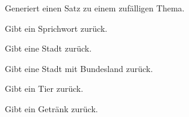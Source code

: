 \documentclass[a4paper,12pt,oneside]{sphinxmanual}
\begin{document}

\begin{fulllineitems}
\label{funktionen:pyzufall.satz_thema}
Generiert einen Satz zu einem zufälligen Thema.

\end{fulllineitems}


\begin{fulllineitems}
\label{funktionen:pyzufall.sprichwort}
Gibt ein Sprichwort zurück.

\end{fulllineitems}


\begin{fulllineitems}
\label{funktionen:pyzufall.stadt}
Gibt eine Stadt zurück.

\end{fulllineitems}


\begin{fulllineitems}
\label{funktionen:pyzufall.stadt_bl}
Gibt eine Stadt mit Bundesland zurück.

\end{fulllineitems}


\begin{fulllineitems}
\label{funktionen:pyzufall.tier}
Gibt ein Tier zurück.

\end{fulllineitems}


\begin{fulllineitems}
\label{funktionen:pyzufall.trinken}
Gibt ein Getränk zurück.

\end{fulllineitems}

\end{document}
